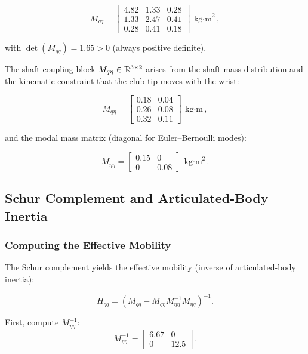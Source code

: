 \begin{equation}
M_{qq} = \begin{bmatrix}
4.82 & 1.33 & 0.28 \\
1.33 & 2.47 & 0.41 \\
0.28 & 0.41 & 0.18
\end{bmatrix}~\text{kg$\cdot$m}^2,
\label{eq:ch8:Mqq-numeric}
\end{equation}

with $\det(M_{qq}) = 1.65 > 0$ (always positive definite).

The shaft-coupling block $M_{q\eta} \in \mathbb{R}^{3\times 2}$ arises from the shaft mass distribution
and the kinematic constraint that the club tip moves with the wrist:

\begin{equation}
M_{q\eta} = \begin{bmatrix}
0.18 & 0.04 \\
0.26 & 0.08 \\
0.32 & 0.11
\end{bmatrix}~\text{kg$\cdot$m},
\label{eq:ch8:Mqeta-numeric}
\end{equation}

and the modal mass matrix (diagonal for Euler--Bernoulli modes):

\begin{equation}
M_{\eta\eta} = \begin{bmatrix}
0.15 & 0 \\
0 & 0.08
\end{bmatrix}~\text{kg$\cdot$m}^2.
\label{eq:ch8:Metaeta-numeric}
\end{equation}

\subsection{Schur Complement and Articulated-Body Inertia}

\subsubsection{Computing the Effective Mobility}

The Schur complement yields the effective mobility (inverse of articulated-body inertia):

\begin{equation}
H_{qq} = (M_{qq}-M_{q\eta}M_{\eta\eta}^{-1}M_{\eta q})^{-1}.
\label{eq:ch8:H-def}
\end{equation}

First, compute $M_{\eta\eta}^{-1}$:
\begin{equation}
M_{\eta\eta}^{-1} = \begin{bmatrix}
6.67 & 0 \\
0 & 12.5
\end{bmatrix}.
\end{equation}

